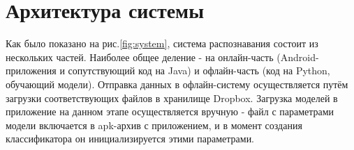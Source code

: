 
\section{Архитектура системы}

Как было показано на рис.\ref{fig:system}, система распознавания состоит из нескольких частей. Наиболее общее деление - на онлайн-часть (Android-приложения и сопутствующий код на Java) и офлайн-часть (код на Python, обучающий модели). Отправка данных в офлайн-систему осуществляется путём загрузки соответствующих файлов в хранилище Dropbox. Загрузка моделей в приложение на данном этапе осуществляется вручную - файл с параметрами модели включается в apk-архив с приложением, и в момент создания классификатора он инициализируется этими параметрами.


